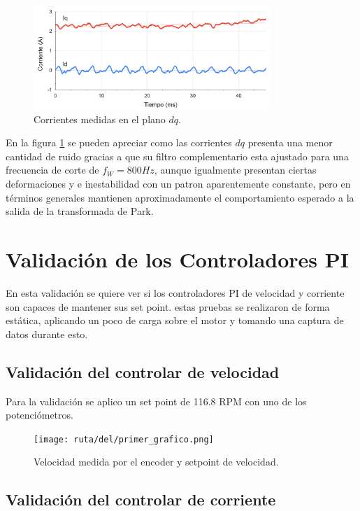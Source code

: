 \documentclass[11pt]{report}
\begin{document}
\begin{figure}[ht]
	\centering
	\includegraphics[width=0.8\textwidth]{imagenes/Corrientes_dq.png}
	\caption{Corrientes medidas en el plano $dq$.}
	\label{corrientes_dq}
\end{figure}
\FloatBarrier

En la figura \ref{corrientes_dq} se pueden apreciar como las corrientes $dq$ presenta una menor cantidad de ruido gracias a que su filtro complementario esta ajustado para una frecuencia de corte de $f_W=800Hz$, aunque igualmente presentan ciertas deformaciones y e inestabilidad con un patron aparentemente constante, pero en términos generales mantienen aproximadamente el comportamiento esperado a la salida de la transformada de Park.

\newpage
\section{Validación de los Controladores PI}
En esta validación se quiere ver si los controladores PI de velocidad y corriente son capaces de mantener sus set point. estas pruebas se realizaron de forma estática, aplicando un poco de carga sobre el motor y tomando una captura de datos durante esto.

\subsection{Validación del controlar de velocidad}
Para la validación se aplico un set point de 116.8 RPM con uno de los potenciómetros.

\begin{figure}[ht]
	\centering
	\texttt{[image: ruta/del/primer\_grafico.png]}
	\caption{Velocidad medida por el encoder y setpoint de velocidad.}
	\label{velocidad_encoder}
\end{figure}
\FloatBarrier

\subsection{Validación del controlar de corriente}
\end{document}
